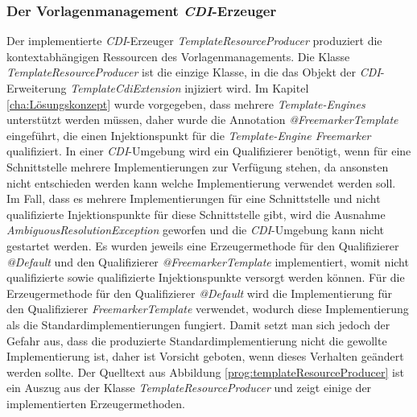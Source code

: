 \subsubsection{Der Vorlagenmanagement \emph{CDI}-Erzeuger}
Der implementierte \emph{CDI}-Erzeuger \emph{TemplateResourceProducer} produziert die kontextabhängigen Ressourcen des Vorlagenmanagements. Die Klasse \emph{TemplateResourceProducer} ist die einzige Klasse, in die das Objekt der \emph{CDI}-Erweiterung \emph{TemplateCdiExtension} injiziert wird. Im Kapitel \ref{cha:Lösungskonzept} wurde vorgegeben, dass mehrere \emph{Template-Engines} unterstützt werden müssen, daher wurde die Annotation \emph{@FreemarkerTemplate} eingeführt, die einen Injektionspunkt für die \emph{Template-Engine Freemarker} qualifiziert. In einer \emph{CDI}-Umgebung wird ein Qualifizierer benötigt, wenn für eine Schnittstelle mehrere Implementierungen zur Verfügung stehen, da ansonsten nicht entschieden werden kann welche Implementierung verwendet werden soll. Im Fall, dass es mehrere Implementierungen für eine Schnittstelle und nicht qualifizierte Injektionspunkte für diese Schnittstelle gibt, wird die Ausnahme \emph{AmbiguousResolutionException} geworfen und die \emph{CDI}-Umgebung kann nicht gestartet werden. 
\newline
\newline
Es wurden jeweils eine Erzeugermethode für den Qualifizierer \emph{@Default} und den Qualifizierer \emph{@FreemarkerTemplate} implementiert, womit nicht qualifizierte sowie qualifizierte Injektionspunkte versorgt werden können. Für die Erzeugermethode für den Qualifizierer \emph{@Default} wird die Implementierung für den Qualifizierer \emph{FreemarkerTemplate} verwendet, wodurch diese Implementierung als die Standardimplementierungen fungiert. Damit setzt man sich jedoch der Gefahr aus, dass die produzierte Standardimplementierung nicht die gewollte Implementierung ist, daher ist Vorsicht geboten, wenn dieses Verhalten geändert werden sollte. 
\newline
\newline
Der Quelltext aus Abbildung \ref{prog:templateResourceProducer} ist ein Auszug aus der Klasse \emph{TemplateResourceProducer} und zeigt einige der implementierten Erzeugermethoden. 
